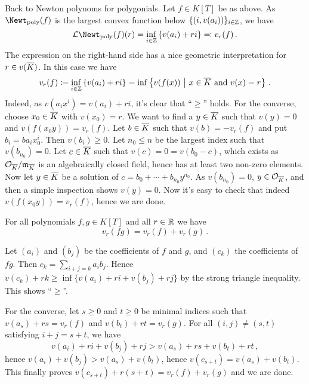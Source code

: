 Back to Newton polynoms for polygonials. Let $f\in K[T]$ be as above. As $\Newt_\poly(f)$ is the largest convex function below $\{(i,v(a_i))\}_{i\in \mathbb{Z}}$, we have
\begin{equation*}
	\Ll\Newt_\poly(f)(r)=\inff_{i\in\IZ}\left\{v(a_i)+ri\right\}\eqqcolon v_r(f)\,.
\end{equation*}
The expression on the right-hand side has a nice geometric interpretation for $r\in v(\ov{K})$. In this case we have
\begin{equation*}
	v_r(f)\coloneqq \inff_{i\in\IZ}\left\{v(a_i)+ri\right\}=\inff\left\{v(f(x))\st x\in\ov{K}\text{ and }v(x)=r\right\}\,.
\end{equation*}
Indeed, as $v(a_ix^i)=v(a_i)+ri$, it's clear that \enquote{$\geq $} holds. For the converse, choose $x_0\in\ov{K}$ with $v(x_0)=r$. We want to find a $y\in\ov{K}$ such that $v(y)=0$ and $v(f(x_0y))=v_r(f)$. Let $b\in \ov{K}$ such that $v(b)=-v_r(f)$ and put $b_i=ba_ix_0^i$. Then $v(b_i)\geq 0$. Let $n_0\leq n$ be the largest index such that $v(b_{n_0})=0$. Let $c\in\ov{K}$ such that $v(c)=0=v(b_0-c)$, which exists as $\Oo_{\ov{K}}/\mm_{\ov{K}}$ is an algebraically closed field, hence has at least two non-zero elements. Now let $y\in\ov{K}$ be a solution of $c=b_0+\dotsb+b_{n_0}y^{n_0}$. As $v(b_{n_0})=0$, $y\in\Oo_{\ov{K}}$, and then a simple inspection shows $v(y)=0$. Now it's easy to check that indeed $v(f(x_0y))=v_r(f)$, hence we are done. 
\begin{exc}\label{exc:vrOfProduct}
	For all polynomials $f,g\in K[T]$ and all $r\in\mathbb{R}$ we have 
	\begin{equation*}
		v_r(fg)=v_r(f)+v_r(g)\,.
	\end{equation*}
\end{exc}
\begin{proof*}
	Let $(a_i)$ and $(b_j)$ be the coefficients of $f$ and $g$, and $(c_k)$ the coefficients of $fg$. Then $c_k=\sum_{i+j=k}a_ib_j$. Hence $v(c_k)+rk\geq \inf\{v(a_i)+ri+v(b_j)+rj\}$ by the strong triangle inequality. This shows \enquote{$\geq$}. 
	
	For the converse, let $s\geq 0$ and $t\geq 0$ be minimal indices such that $v(a_s)+rs=v_r(f)$ and $v(b_t)+rt=v_r(g)$. For all $(i,j)\neq (s,t)$ satisfying $i+j=s+t$, we have 
	\begin{equation*}
		v(a_i)+ri+v(b_j)+rj>v(a_s)+rs+v(b_t)+rt\,,
	\end{equation*}
	hence $v(a_i)+v(b_j)>v(a_s)+v(b_t)$, hence $v(c_{s+t})=v(a_s)+v(b_t)$. This finally proves $v(c_{s+t})+r(s+t)=v_r(f)+v_r(g)$ and we are done.
\end{proof*}
